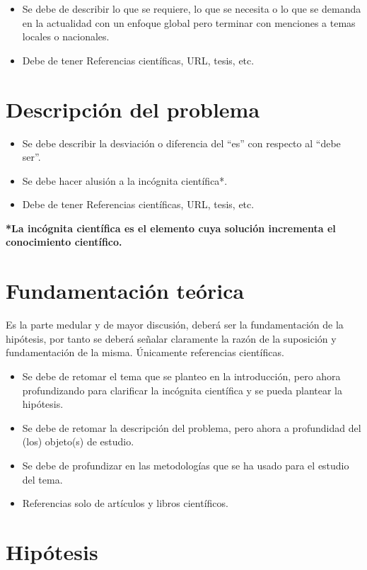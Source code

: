     \begin{itemize}
        \item Se debe de describir lo que se requiere, lo que se necesita o lo que se demanda en la actualidad con un enfoque global pero terminar con menciones a temas locales o nacionales.
        \item Debe de tener Referencias científicas, URL, tesis, etc.
    \end{itemize}
    \section{Descripción del problema}
    \begin{itemize}
        \item Se debe describir la desviación o diferencia del ``es'' con respecto al ``debe ser''.
        \item Se debe hacer alusión a la incógnita científica*.
        \item Debe de tener Referencias científicas, URL, tesis, etc.
    \end{itemize}
    
    \textbf{*La incógnita científica es el elemento cuya solución incrementa el conocimiento científico.}
    \section{Fundamentación teórica}
    
    Es la parte medular y de mayor discusión, deberá ser la fundamentación de la hipótesis, por tanto se deberá señalar claramente la razón de la suposición y fundamentación de la misma. Únicamente referencias científicas.
    \begin{itemize}
        \item Se debe de retomar el tema que se planteo en la introducción, pero ahora profundizando para clarificar la incógnita científica y se pueda plantear la hipótesis.
        \item Se debe de retomar la descripción del problema, pero ahora a profundidad del (los) objeto(s) de estudio. 
        \item Se debe de profundizar en las metodologías que se ha usado para el estudio del tema.
        \item Referencias solo de artículos y libros científicos.
    \end{itemize}
    \section{Hipótesis}
    
